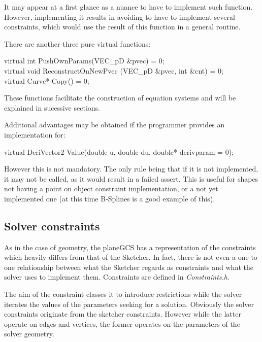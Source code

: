 \documentclass[12pt,twoside,a4paper]{book}
\begin{document}
    It may appear at a first glance as a nuance to have to implement such function. However, implementing it results in avoiding to have to implement several constraints, which would use the result of this function in a general routine.

    There are another three pure virtual functions:

    \begin{codequote}
    virtual int PushOwnParams(VEC\_pD \&pvec) = 0;\\
    virtual void ReconstructOnNewPvec (VEC\_pD \&pvec, int \&cnt) = 0;\\
    virtual Curve* Copy() = 0;
    \end{codequote}

    These functions facilitate the construction of equation systems and will be explained in sucessive sections.

    Additional advantages may be obtained if the programmer provides an implementation for:

    \begin{codequote}
    virtual DeriVector2 Value(double u, double du, double* derivparam = 0);
    \end{codequote}

    However this is not mandatory. The only rule being that if it is not implemented, it may not be called, as it would result in a failed assert. This is useful for shapes not having a point on object constraint implementation, or a not yet implemented one (at this time B-Splines is a good example of this).

    \subsection{Solver constraints}
    \label{sec:solverconstraints}
    As in the case of geometry, the planeGCS has a representation of the constraints which heavily differs from that of the Sketcher. In fact, there is not even a one to one relationship between what the Sketcher regards as constraints and what the solver uses to implement them. Constraints are defined in \emph{Constraints.h}.

    The aim of the constraint classes it to introduce restrictions while the solver iterates the values of the parameters seeking for a solution. Obviously the solver constraints originate from the sketcher constraints. However while the latter operate on edges and vertices, the former operates on the parameters of the solver geometry.
\end{document}

